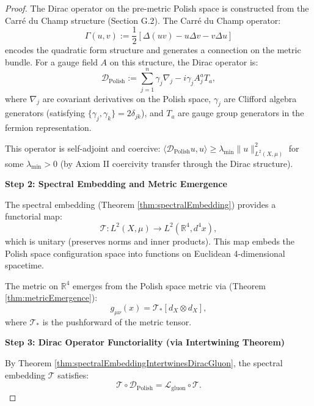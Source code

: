 \begin{theorem}
\begin{proof}
The Dirac operator on the pre-metric Polish space is constructed from the Carré du Champ structure (Section G.2). The Carré du Champ operator:
\begin{equation}
\Gamma(u, v) := \frac{1}{2}[\Delta(uv) - u\Delta v - v\Delta u]
\end{equation}
encodes the quadratic form structure and generates a connection on the metric bundle. For a gauge field $A$ on this structure, the Dirac operator is:
\begin{equation}
\mathcal{D}_{\mathrm{Polish}} := \sum_{j=1}^n \gamma_j \nabla_j - i \gamma_j A_j^a T_a,
\end{equation}
where $\nabla_j$ are covariant derivatives on the Polish space, $\gamma_j$ are Clifford algebra generators (satisfying $\{\gamma_j, \gamma_k\} = 2\delta_{jk}$), and $T_a$ are gauge group generators in the fermion representation.

This operator is self-adjoint and coercive: $\langle \mathcal{D}_{\mathrm{Polish}} u, u \rangle \geq \lambda_{\min} \|u\|_{L^2(X, \mu)}^2$ for some $\lambda_{\min} > 0$ (by Axiom II coercivity transfer through the Dirac structure).

\textbf{Step 2: Spectral Embedding and Metric Emergence}

The spectral embedding (Theorem \ref{thm:spectralEmbedding}) provides a functorial map:
\begin{equation}
\mathcal{T}: L^2(X, \mu) \to L^2(\mathbb{R}^4, d^4x),
\end{equation}
which is unitary (preserves norms and inner products). This map embeds the Polish space configuration space into functions on Euclidean 4-dimensional spacetime.

The metric on $\mathbb{R}^4$ emerges from the Polish space metric via (Theorem \ref{thm:metricEmergence}):
\begin{equation}
g_{\mu\nu}(x) = \mathcal{T}_* [d_X \otimes d_X],
\end{equation}
where $\mathcal{T}_*$ is the pushforward of the metric tensor.

\textbf{Step 3: Dirac Operator Functoriality (via Intertwining Theorem)}

By Theorem \ref{thm:spectralEmbeddingIntertwinesDiracGluon}, the spectral embedding $\mathcal{T}$ satisfies:
\begin{equation}
\mathcal{T} \circ \mathcal{D}_{\mathrm{Polish}} = \mathcal{L}_{\mathrm{gluon}} \circ \mathcal{T}.
\end{equation}


\end{proof}
\end{theorem}
